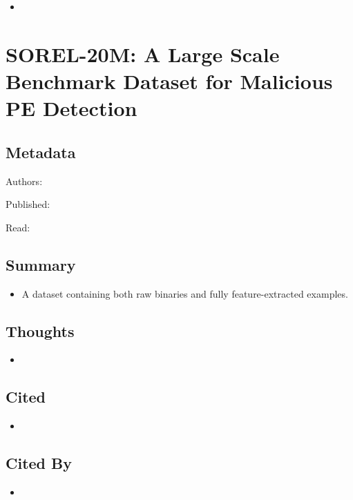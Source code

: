 \documentclass{article}
\begin{document}
\begin{itemize}
\item
\end{itemize}

\pagebreak


\section*{SOREL-20M: A Large Scale Benchmark Dataset for Malicious PE Detection}

\subsection*{Metadata}

\noindent Authors:

\noindent Published:

\noindent Read:

\subsection*{Summary}
\begin{itemize}
\item A dataset containing both raw binaries and fully feature-extracted examples.
\end{itemize}

\subsection*{Thoughts}
\begin{itemize}
\item
\end{itemize}

\subsection*{Cited}
\begin{itemize}
\item
\end{itemize}

\subsection*{Cited By}
\begin{itemize}
\item
\end{itemize}
\end{document}

